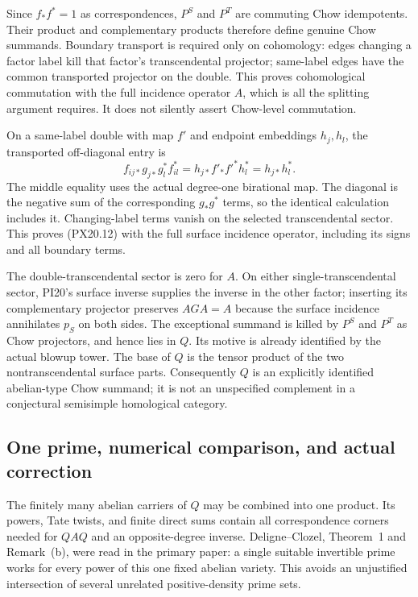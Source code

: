 Since $f_*f^*=1$ as correspondences, $P^S$ and $P^T$ are commuting
Chow idempotents. Their product and complementary products therefore
define genuine Chow summands. Boundary transport is required only on
cohomology: edges changing a factor label kill that factor's
transcendental projector; same-label edges have the common transported
projector on the double. This proves cohomological commutation with
the full incidence operator $A$, which is all the splitting argument
requires. It does not silently assert Chow-level commutation.

On a same-label double with map $f'$ and endpoint embeddings $h_j,h_l$,
the transported off-diagonal entry is
\[
 f_{ij*}g_{j*}g_l^*f_{il}^*
     =h_{j*}f'_*f'^*h_l^*=h_{j*}h_l^*.
\]
The middle equality uses the actual degree-one birational map.
The diagonal is the negative sum of the corresponding
$g_*g^*$ terms, so the identical calculation includes it.
Changing-label terms vanish on the selected transcendental sector.
This proves (PX20.12) with the full surface incidence operator,
including its signs and all boundary terms.

The double-transcendental sector is zero for $A$. On either
single-transcendental sector, PI20's surface inverse supplies the
inverse in the other factor; inserting its complementary projector
preserves $AGA=A$ because the surface incidence annihilates $p_S$
on both sides. The exceptional summand is killed by $P^S$ and $P^T$
as Chow projectors, and hence lies in $Q$. Its motive is already
identified by the actual blowup tower. The base of $Q$ is the tensor
product of the two nontranscendental surface parts. Consequently
$Q$ is an explicitly identified abelian-type Chow summand; it is not
an unspecified complement in a conjectural semisimple homological
category.

\subsection{One prime, numerical comparison, and actual correction}

The finitely many abelian carriers of $Q$ may be combined into one
product. Its powers, Tate twists, and finite direct sums contain all
correspondence corners needed for $QAQ$ and an opposite-degree inverse.
Deligne--Clozel, Theorem~1 and Remark~(b), were read in the primary
paper: a single suitable invertible prime works for every power of
this one fixed abelian variety. This avoids an unjustified
intersection of several unrelated positive-density prime sets.

